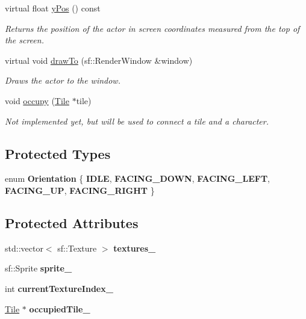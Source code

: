 \begin{DoxyCompactItemize}
virtual float \mbox{\hyperlink{classActor_a7792909f3e9ca8eff707cf7b21b712fe}{y\+Pos}} () const
\begin{DoxyCompactList}\small\item\em Returns the position of the actor in screen coordinates measured from the top of the screen. \end{DoxyCompactList}\item 
virtual void \mbox{\hyperlink{classActor_af73a6f6670f0507c9e55ec2f61293535}{draw\+To}} (sf\+::\+Render\+Window \&window)
\begin{DoxyCompactList}\small\item\em Draws the actor to the window. \end{DoxyCompactList}\item 
void \mbox{\hyperlink{classActor_a75f9ef62ab9b6f7879cf0c1483b73866}{occupy}} (\mbox{\hyperlink{classTile}{Tile}} $\ast$tile)
\begin{DoxyCompactList}\small\item\em Not implemented yet, but will be used to connect a tile and a character. \end{DoxyCompactList}\end{DoxyCompactItemize}
\subsection*{Protected Types}
\begin{DoxyCompactItemize}
\item 
\mbox{\label{classActor_a4b047a88e9d99e98e3e594b6a82d5b3a}} 
enum {\bfseries Orientation} \{ \newline
{\bfseries I\+D\+LE}, 
{\bfseries F\+A\+C\+I\+N\+G\+\_\+\+D\+O\+WN}, 
{\bfseries F\+A\+C\+I\+N\+G\+\_\+\+L\+E\+FT}, 
{\bfseries F\+A\+C\+I\+N\+G\+\_\+\+UP}, 
\newline
{\bfseries F\+A\+C\+I\+N\+G\+\_\+\+R\+I\+G\+HT}
 \}
\end{DoxyCompactItemize}
\subsection*{Protected Attributes}
\begin{DoxyCompactItemize}
\item 
\mbox{\label{classActor_a43ebda582cf6b4c050da761c26f907f9}} 
std\+::vector$<$ sf\+::\+Texture $>$ {\bfseries textures\+\_\+}
\item 
\mbox{\label{classActor_a2f9a76df5f156b58ee3f452df967ddc8}} 
sf\+::\+Sprite {\bfseries sprite\+\_\+}
\item 
\mbox{\label{classActor_a86f1fc3c5134b89fa4b3be5f35db85fa}} 
int {\bfseries current\+Texture\+Index\+\_\+}
\item 
\mbox{\label{classActor_a175bba65c182ee06cec92accb30af570}} 
\mbox{\hyperlink{classTile}{Tile}} $\ast$ {\bfseries occupied\+Tile\+\_\+}
\end{DoxyCompactItemize}



